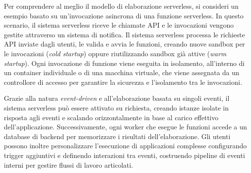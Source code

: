 Per comprendere al meglio il modello di elaborazione serverless, si consideri un esempio basato su un'invocazione asincrona di una funzione serverless. In questo scenario, il sistema serverless riceve le chiamate API e le invocazioni vengono gestite attraverso un sistema di notifica. Il sistema serverless processa le richieste API inviate dagli utenti, le valida e avvia le funzioni, creando nuove sandbox per le invocazioni (\textit{cold startup}) oppure riutilizzando sandbox già attive (\textit{warm startup}). Ogni invocazione di funzione viene eseguita in isolamento, all'interno di un container individuale o di una macchina virtuale, che viene assegnata da un controllore di accesso per garantire la sicurezza e l'isolamento tra le invocazioni.

Grazie alla natura \textit{event-driven} e all’elaborazione basata su singoli eventi, il sistema serverless può essere attivato su richiesta, creando istanze isolate in risposta agli eventi e scalando orizzontalmente in base al carico effettivo dell'applicazione. Successivamente, ogni worker che esegue le funzioni accede a un database di backend per memorizzare i risultati dell'elaborazione. Gli utenti possono inoltre personalizzare l'esecuzione di applicazioni complesse configurando trigger aggiuntivi e definendo interazioni tra eventi, costruendo pipeline di eventi interni per gestire flussi di lavoro articolati.\cite{10.1145/3508360}

